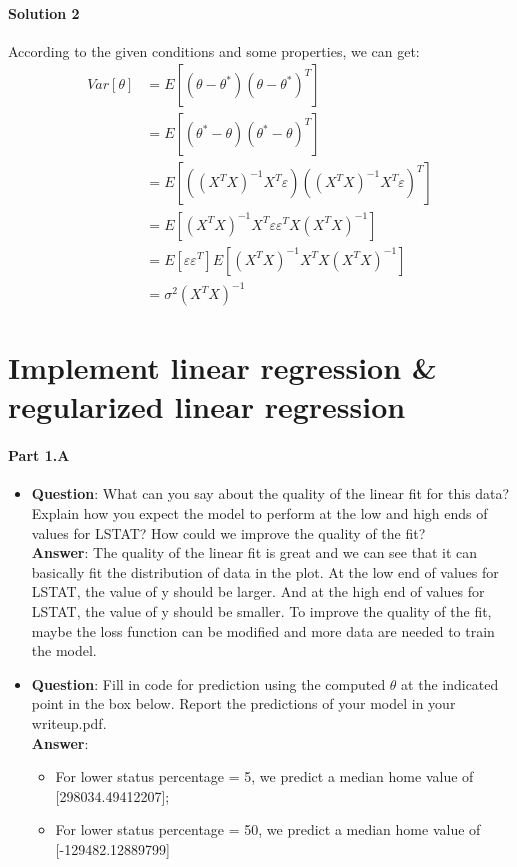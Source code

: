 \documentclass[paper=a4, fontsize=11pt]{scrartcl} %
\numberwithin{equation}{section} %
\numberwithin{figure}{section} %
\numberwithin{table}{section} %
\begin{document}
\paragraph{\textbf{Solution 2}}
According to the given conditions and some properties, we can get:
\begin{align*}
Var\left [ \theta \right ]&=E\left [ \left ( \theta -\theta^{*}  \right )\left ( \theta -\theta^{*}  \right )^{T} \right ]
\\ &=E\left [ \left ( \theta^{*} -\theta  \right )\left ( \theta^{*} -\theta \right )^{T} \right ]
\\ &=E\left [ \left (\left ( X^{T}X \right )^{-1}X^{T}\varepsilon   \right ) \left ( \left ( X^{T}X \right )^{-1}X^{T}\varepsilon  \right )^{T}\right ]
\\ &=E\left [\left ( X^{T}X \right )^{-1}X^{T}\varepsilon\varepsilon^{T}X\left ( X^{T}X \right )^{-1}\right ]
\\ &=E\left [ \varepsilon \varepsilon ^{T} \right ]E\left [ \left ( X^{T}X \right )^{-1}X^{T}X \left ( X^{T}X \right )^{-1}\right ]
\\ &=\sigma ^{2}\left ( X^{T}X \right )^{-1}
\end{align*}

\section{Implement linear regression \& regularized linear regression}

\paragraph{\textbf{Part 1.A}}
\begin{itemize}
	\item
        \textbf{Question}: What can you say about the quality of the linear fit for this data? Explain how you expect the model to perform at the low and high ends of values for LSTAT? How could we improve the quality of the fit?
        \\ \textbf{Answer}: The quality of the linear fit is great and we can see that it can basically fit the distribution of data in the plot. At the low end of values for LSTAT, the value of y should be larger. And at the high end of values for LSTAT, the value of y should be smaller. To improve the quality of the fit, maybe the loss function can be modified and more data are needed to train the model.
    \item
        \textbf{Question}: Fill in code for prediction using the computed $\theta$ at the indicated point in the box below. Report the predictions of your model in your writeup.pdf.
        \\ \textbf{Answer}:
        \begin{itemize}
        \item For lower status percentage = 5, we predict a median home value of [298034.49412207];
        \item For lower status percentage = 50, we predict a median home value of [-129482.12889799]
        \end{itemize}
\end{itemize}
\end{document}
